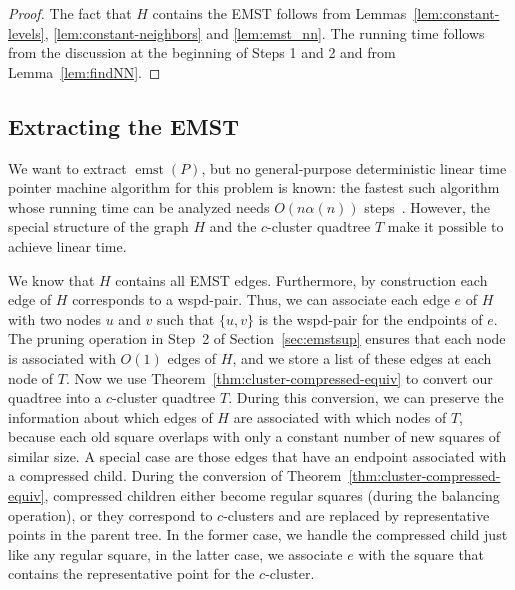 \documentclass[11pt]{paper}
\DeclareMathOperator {\emst}{emst}
\begin{document}
\begin{proof}
The fact that $H$ contains the EMST follows
from Lemmas~\ref{lem:constant-levels}, \ref{lem:constant-neighbors} and
\ref{lem:emst_nn}. The running time follows from the discussion at the
beginning of Steps 1 and 2 
and from Lemma~\ref{lem:findNN}.
\end{proof}

\subsection {Extracting the EMST}
  We want to extract $\emst(P)$, but no general-purpose deterministic linear 
  time pointer machine algorithm for this problem is known:
  the fastest such algorithm whose running time can be analyzed
  needs $O (n \alpha (n))$ steps~\cite {Chazelle00}.
  However, the special structure of the graph $H$ and the $c$-cluster quadtree
  $T$ make it possible to achieve linear time.

  We know that $H$  contains all EMST edges.
  Furthermore, by construction each edge of $H$ corresponds
  to a wspd-pair. Thus, we can associate each edge $e$
  of $H$ with two nodes $u$ and $v$ such that $\{u,v\}$ is
  the wspd-pair for the endpoints of $e$. The pruning operation in
  Step~2 of Section~\ref{sec:emstsup} ensures that each
  node is associated with $O(1)$ edges of $H$, and we store
  a list of these edges at each node of $T$.
  Now we use Theorem~\ref{thm:cluster-compressed-equiv}
  to convert our quadtree into a $c$-cluster quadtree $T$.
  During this conversion, we can preserve the information
  about which edges of $H$ are associated with which 
  nodes of $T$, because each old square overlaps with 
  only a constant number of new squares of similar
  size. A special case are those edges that have an
  endpoint associated with a compressed child.
  During the conversion of Theorem~\ref{thm:cluster-compressed-equiv},
  compressed children either become regular squares (during the balancing
  operation), or they correspond to $c$-clusters and are replaced
  by representative points in the parent tree. In the former case,
  we handle the compressed child just like any regular square, in the latter
  case, we associate $e$ with the square that contains the representative
  point for the $c$-cluster.
  
\end{document}
